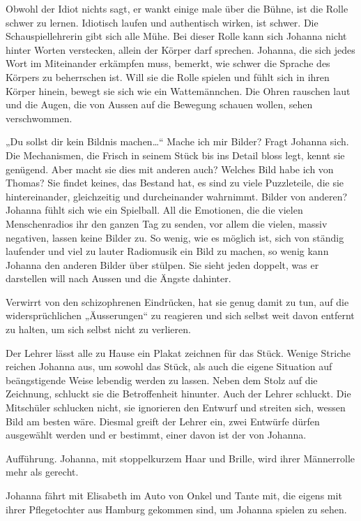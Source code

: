 \documentclass[10pt,a5paper]{book}
\begin{document}
Obwohl der Idiot nichts sagt, er wankt einige male über die Bühne, ist die Rolle schwer zu lernen. Idiotisch laufen und authentisch wirken, ist schwer. Die Schauspiellehrerin gibt sich alle Mühe. Bei dieser Rolle kann sich Johanna nicht hinter Worten verstecken, allein der Körper darf sprechen. Johanna, die sich jedes Wort im Miteinander erkämpfen muss, bemerkt, wie schwer die Sprache des Körpers zu beherrschen ist. Will sie die Rolle spielen und fühlt sich in ihren Körper hinein, bewegt sie sich wie ein Wattemännchen. Die Ohren rauschen laut und die Augen, die von Aussen auf die Bewegung schauen wollen, sehen verschwommen. 


„Du sollst dir kein Bildnis machen\dots “ Mache ich mir Bilder? Fragt Johanna sich. Die Mechanismen, die Frisch in seinem Stück bis ins Detail bloss legt, kennt sie genügend. Aber macht sie dies mit anderen auch? Welches Bild habe ich von Thomas? Sie findet keines, das Bestand hat, es sind zu viele Puzzleteile, die sie hintereinander, gleichzeitig und durcheinander wahrnimmt. Bilder von anderen? Johanna fühlt sich wie ein Spielball. All die Emotionen, die die vielen Menschenradios ihr den ganzen Tag zu senden, vor allem die vielen, massiv negativen, lassen keine Bilder zu. So wenig, wie es möglich ist, sich von ständig laufender und viel zu lauter Radiomusik ein Bild zu machen, so wenig kann Johanna den anderen Bilder über stülpen. Sie sieht jeden doppelt, was er darstellen will nach Aussen und die Ängste dahinter. 

Verwirrt von den schizophrenen Eindrücken, hat sie genug damit zu tun, auf die widersprüchlichen „Äusserungen“ zu reagieren und sich selbst weit davon entfernt zu halten, um sich selbst nicht zu verlieren.

Der Lehrer lässt alle zu Hause ein Plakat zeichnen für das Stück. Wenige Striche reichen Johanna aus, um sowohl das Stück, als auch die eigene Situation auf beängstigende Weise lebendig werden zu lassen. Neben dem Stolz auf die Zeichnung, schluckt sie die Betroffenheit hinunter. Auch der Lehrer schluckt. Die Mitschüler schlucken nicht, sie ignorieren den Entwurf und streiten sich, wessen Bild am besten wäre. Diesmal greift der Lehrer ein, zwei Entwürfe dürfen ausgewählt werden und er bestimmt, einer davon ist der von Johanna.

Aufführung. Johanna, mit stoppelkurzem Haar und Brille, wird ihrer Männerrolle mehr als gerecht. 

Johanna fährt mit Elisabeth im Auto von Onkel und Tante mit, die eigens mit ihrer Pflegetochter aus Hamburg gekommen sind, um Johanna spielen zu sehen. 
\end{document}
